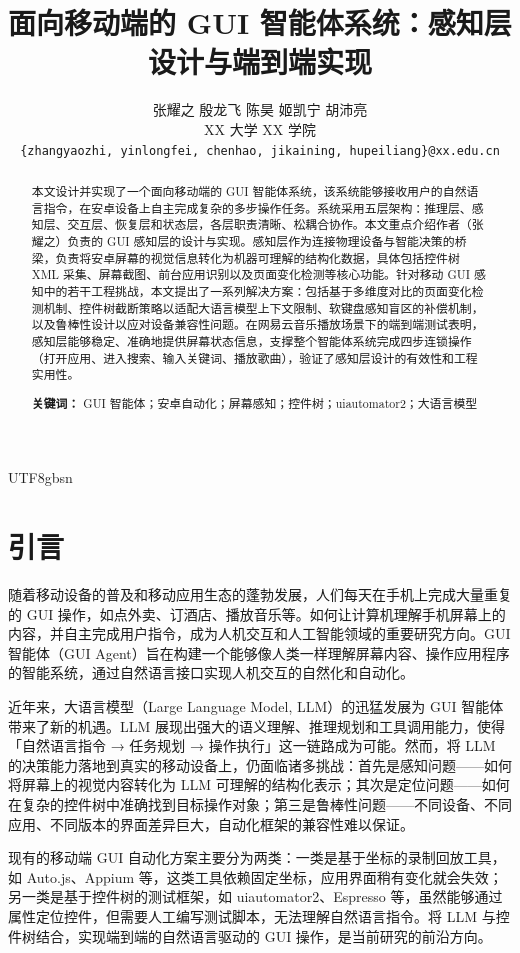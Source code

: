 \documentclass{article}
\title{面向移动端的 GUI 智能体系统：感知层设计与端到端实现}
\author{
  张耀之 \quad 殷龙飞 \quad 陈昊 \quad 姬凯宁 \quad 胡沛亮 \\
  XX 大学 XX 学院 \\
  \texttt{\{zhangyaozhi, yinlongfei, chenhao, jikaining, hupeiliang\}@xx.edu.cn}
}
\begin{document}
\begin{CJK}{UTF8}{gbsn}
\maketitle

\begin{abstract}
本文设计并实现了一个面向移动端的 GUI 智能体系统，该系统能够接收用户的自然语言指令，在安卓设备上自主完成复杂的多步操作任务。系统采用五层架构：推理层、感知层、交互层、恢复层和状态层，各层职责清晰、松耦合协作。本文重点介绍作者（张耀之）负责的 GUI 感知层的设计与实现。感知层作为连接物理设备与智能决策的桥梁，负责将安卓屏幕的视觉信息转化为机器可理解的结构化数据，具体包括控件树 XML 采集、屏幕截图、前台应用识别以及页面变化检测等核心功能。针对移动 GUI 感知中的若干工程挑战，本文提出了一系列解决方案：包括基于多维度对比的页面变化检测机制、控件树截断策略以适配大语言模型上下文限制、软键盘感知盲区的补偿机制，以及鲁棒性设计以应对设备兼容性问题。在网易云音乐播放场景下的端到端测试表明，感知层能够稳定、准确地提供屏幕状态信息，支撑整个智能体系统完成四步连锁操作（打开应用、进入搜索、输入关键词、播放歌曲），验证了感知层设计的有效性和工程实用性。

\textbf{关键词：} GUI 智能体；安卓自动化；屏幕感知；控件树；uiautomator2；大语言模型
\end{abstract}

\section{引言}
\label{sec:introduction}

随着移动设备的普及和移动应用生态的蓬勃发展，人们每天在手机上完成大量重复的 GUI 操作，如点外卖、订酒店、播放音乐等。如何让计算机理解手机屏幕上的内容，并自主完成用户指令，成为人机交互和人工智能领域的重要研究方向。GUI 智能体（GUI Agent）旨在构建一个能够像人类一样理解屏幕内容、操作应用程序的智能系统，通过自然语言接口实现人机交互的自然化和自动化。

近年来，大语言模型（Large Language Model, LLM）的迅猛发展为 GUI 智能体带来了新的机遇。LLM 展现出强大的语义理解、推理规划和工具调用能力，使得「自然语言指令 → 任务规划 → 操作执行」这一链路成为可能。然而，将 LLM 的决策能力落地到真实的移动设备上，仍面临诸多挑战：首先是感知问题——如何将屏幕上的视觉内容转化为 LLM 可理解的结构化表示；其次是定位问题——如何在复杂的控件树中准确找到目标操作对象；第三是鲁棒性问题——不同设备、不同应用、不同版本的界面差异巨大，自动化框架的兼容性难以保证。

现有的移动端 GUI 自动化方案主要分为两类：一类是基于坐标的录制回放工具，如 Auto.js、Appium 等，这类工具依赖固定坐标，应用界面稍有变化就会失效；另一类是基于控件树的测试框架，如 uiautomator2、Espresso 等，虽然能够通过属性定位控件，但需要人工编写测试脚本，无法理解自然语言指令。将 LLM 与控件树结合，实现端到端的自然语言驱动的 GUI 操作，是当前研究的前沿方向。


\end{CJK}
\end{document}
